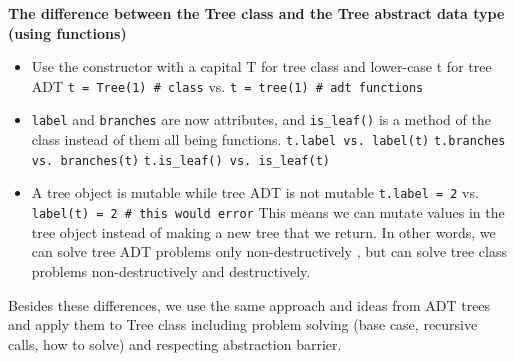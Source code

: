 \vspace{2mm}
\textbf{The difference between the Tree class and the Tree abstract data type (using functions)}

\begin{itemize}
  \item Use the constructor with a capital T for tree class and lower-case t for tree ADT
      \subitem \lstinline{t = Tree(1) # class} vs. \lstinline{t = tree(1) # adt functions}
  \item \lstinline{label} and \lstinline{branches} are now attributes, and \lstinline{is_leaf()} is a method of the class instead of them all being functions.
      \subitem \lstinline{t.label vs. label(t)}
      \subitem \lstinline{t.branches vs. branches(t)}
      \subitem \lstinline{t.is_leaf() vs. is_leaf(t)}
  \item A tree object is mutable while tree ADT is not mutable
      \subitem \lstinline{t.label = 2} vs. \lstinline{label(t) = 2 # this would error}
      \subitem This means we can mutate values in the tree object instead of making a new tree that we return. In other words, we can solve tree ADT problems only non-destructively , but can solve tree class problems non-destructively and destructively.
\end{itemize}

Besides these differences, we use the same approach and ideas from ADT trees and apply them to Tree class including problem solving (base case, recursive calls, how to solve)  and respecting abstraction barrier.
